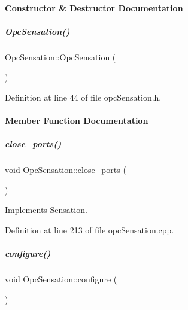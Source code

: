 \paragraph{Constructor \& Destructor Documentation}
\mbox{\label{group__sensationManager_a644655ff11acd5918b0ca3ac465c8528}} 
\subparagraph{\texorpdfstring{Opc\+Sensation()}{OpcSensation()}}
{\footnotesize\ttfamily Opc\+Sensation\+::\+Opc\+Sensation (\begin{DoxyParamCaption}{ }\end{DoxyParamCaption})\hspace{0.3cm}{\ttfamily [inline]}}



Definition at line 44 of file opc\+Sensation.\+h.



\paragraph{Member Function Documentation}
\mbox{\label{group__sensationManager_a53a2ff62e9cecdeeef5f62a23dba8afc}} 
\subparagraph{\texorpdfstring{close\+\_\+ports()}{close\_ports()}}
{\footnotesize\ttfamily void Opc\+Sensation\+::close\+\_\+ports (\begin{DoxyParamCaption}{ }\end{DoxyParamCaption})\hspace{0.3cm}{\ttfamily [virtual]}}



Implements \hyperlink{group__sensationManager_a432fd7cefc45b46a5b4316be787c8e4b}{Sensation}.



Definition at line 213 of file opc\+Sensation.\+cpp.

\mbox{\label{group__sensationManager_accf106fa56c11f31095bfb2258feea03}} 
\subparagraph{\texorpdfstring{configure()}{configure()}}
{\footnotesize\ttfamily void Opc\+Sensation\+::configure (\begin{DoxyParamCaption}{ }\end{DoxyParamCaption})\hspace{0.3cm}{\ttfamily [virtual]}}



